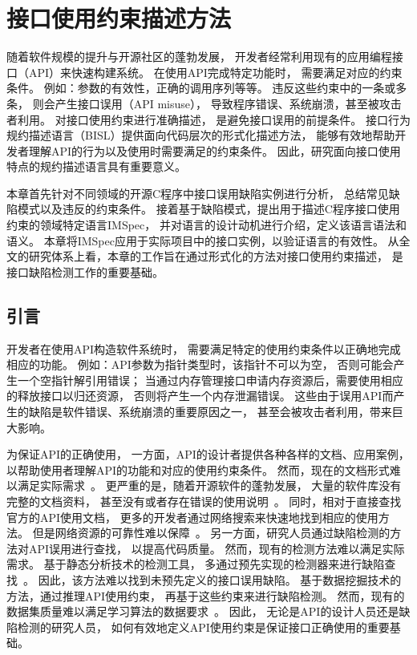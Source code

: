 \chapter{接口使用约束描述方法}
\label{cha:impsec}
随着软件规模的提升与开源社区的蓬勃发展，
开发者经常利用现有的应用编程接口（API）来快速构建系统。
在使用API完成特定功能时，
需要满足对应的约束条件。
例如：参数的有效性，正确的调用序列等等。
违反这些约束中的一条或多条，
则会产生接口误用（API misuse），
导致程序错误、系统崩溃，甚至被攻击者利用。
对接口使用约束进行准确描述，
是避免接口误用的前提条件。
接口行为规约描述语言（BISL）提供面向代码层次的形式化描述方法，
能够有效地帮助开发者理解API的行为以及使用时需要满足的约束条件。
因此，研究面向接口使用特点的规约描述语言具有重要意义。


本章首先针对不同领域的开源C程序中接口误用缺陷实例进行分析，
总结常见缺陷模式以及违反的约束条件。
接着基于缺陷模式，提出用于描述C程序接口使用约束的领域特定语言IMSpec，
并对语言的设计动机进行介绍，定义该语言语法和语义。
本章将IMSpec应用于实际项目中的接口实例，以验证语言的有效性。
从全文的研究体系上看，本章的工作旨在通过形式化的方法对接口使用约束描述，
是接口缺陷检测工作的重要基础。


\section{引言}
开发者在使用API构造软件系统时，
需要满足特定的使用约束条件以正确地完成相应的功能。
例如：API参数为指针类型时，该指针不可以为空，
否则可能会产生一个空指针解引用错误；
当通过内存管理接口申请内存资源后，需要使用相应的释放接口以归还资源，
否则将产生一个内存泄漏错误。
这些由于误用API而产生的缺陷是软件错误、系统崩溃的重要原因之一，
甚至会被攻击者利用，带来巨大影响。


为保证API的正确使用，
一方面，API的设计者提供各种各样的文档、应用案例，
以帮助使用者理解API的功能和对应的使用约束条件。
然而，现在的文档形式难以满足实际需求~\cite{09-icse-doc}。
更严重的是，随着开源软件的蓬勃发展，
大量的软件库没有完整的文档资料，
甚至没有或者存在错误的使用说明~\cite{15-ieee-doc-fail, 17-icse-api-doc}。
同时，相对于直接查找官方的API使用文档，
更多的开发者通过网络搜索来快速地找到相应的使用方法。
但是网络资源的可靠性难以保障~\cite{18-icse-stack}。
另一方面，研究人员通过缺陷检测的方法对API误用进行查找，
以提高代码质量。
然而，现有的检测方法难以满足实际需求。
基于静态分析技术的检测工具，
多通过预先实现的检测器来进行缺陷查找~\cite{15-coufless-static-survey}。
因此，该方法难以找到未预先定义的接口误用缺陷。
基于数据挖掘技术的方法，通过推理API使用约束，
再基于这些约束来进行缺陷检测。
然而，现有的数据集质量难以满足学习算法的数据要求~\cite{survey18}。
因此，
无论是API的设计人员还是缺陷检测的研究人员，
如何有效地定义API使用约束是保证接口正确使用的重要基础。

